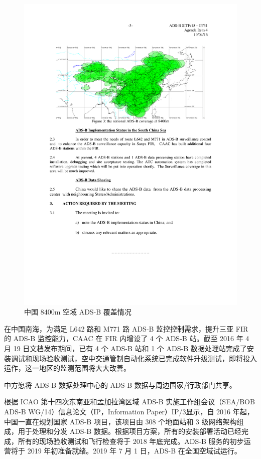 \begin{figure}[!htb]
\centering
\includegraphics[width=13cm]{pic/china_8400m.pdf}
\caption{中国 8400m 空域 ADS-B 覆盖情况\protect\footnotemark}
\label{fig:china_8400m}
\end{figure}


在中国南海，为满足 L642 路和 M771 路 ADS-B 监控控制需求，提升三亚 \acs{FIR} 的 ADS-B 监控能力，CAAC 在 FIR 内增设了 4 个 ADS-B 站。截至 2016 年 4 月 19 日文档发布期间，已有 4 个 ADS-B 站和 1 个 ADS-B 数据处理站完成了安装调试和现场验收测试，空中交通管制自动化系统已完成软件升级测试，即将投入运作，这一地区的监测范围将大大改善。

中方愿将 ADS-B 数据处理中心的 ADS-B 数据与周边国家/行政部门共享。

根据 ICAO 第十四次东南亚和孟加拉湾区域 ADS-B 实施工作组会议（SEA/BOB ADS-B WG/14）信息论文（IP，Information Paper）IP/3显示，自 2016 年起，中国一直在规划国家 ADS-B 项目，该项目由 308 个地面站和 3 级网络架构组成，用于处理和分发 ADS-B 数据。根据项目方案，所有的安装部署活动已经完成，所有的现场验收测试和飞行检查将于 2018 年底完成。ADS-B 服务的初步运营将于 2019 年初准备就绪。2019 年 7 月 1 日，ADS-B 在全国空域试运行。

